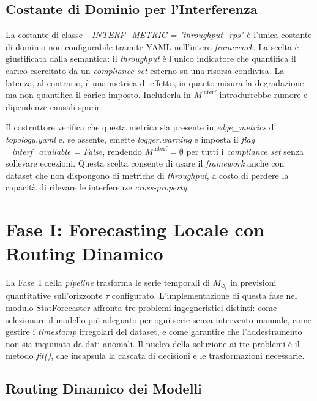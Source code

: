 \subsection{Costante di Dominio per l'Interferenza}
\label{subsec:interf_metric}

La costante di classe \textit{\_INTERF\_METRIC = "throughput\_rps"} è l'unica costante di
dominio non configurabile tramite YAML nell'intero \textit{framework}. La scelta è giustificata
dalla semantica: il \textit{throughput} è l'unico indicatore che quantifica il carico esercitato
da un \textit{compliance set} esterno su una risorsa condivisa. La latenza, al contrario, è una
metrica di effetto, in quanto misura la degradazione ma non quantifica il carico imposto.
Includerla in $M^{\text{interf}}$ introdurrebbe rumore e dipendenze causali spurie.

Il costruttore verifica che questa metrica sia presente in \textit{edge\_metrics} di
\textit{topology.yaml} e, se assente, emette \textit{logger.warning} e imposta il \textit{flag}
\textit{\_interf\_available = False}, rendendo $M^{\text{interf}} = \emptyset$ per tutti i
\textit{compliance set} senza sollevare eccezioni. Questa scelta consente di usare il
\textit{framework} anche con dataset che non dispongono di metriche di \textit{throughput}, a
costo di perdere la capacità di rilevare le interferenze \textit{cross-property}.

\section{Fase I: Forecasting Locale con Routing Dinamico}
\label{sec:impl_fase1}

La Fase~I della \textit{pipeline} trasforma le serie temporali di $M_{\Phi_i}$ in previsioni
quantitative sull'orizzonte $\tau$ configurato. L'implementazione di questa fase nel modulo
StatForecaster affronta tre problemi ingegneristici distinti: come selezionare il modello più
adeguato per ogni serie senza intervento manuale, come gestire i \textit{timestamp} irregolari
del dataset, e come garantire che l'addestramento non sia inquinato da dati anomali. Il nucleo
della soluzione ai tre problemi è il metodo \textit{fit()}, che incapsula la cascata di decisioni
e le trasformazioni necessarie.

\subsection{Routing Dinamico dei Modelli}
\label{subsec:routing_strategy}

